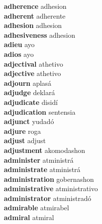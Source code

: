 \textbf{adherence } adhesion \\
\textbf{adherent } adherente \\
\textbf{adhesion } adhesion \\
\textbf{adhesiveness } adhesion \\
\textbf{adieu } ayo \\
\textbf{adios } ayo \\
\textbf{adjectival } athetivo \\
\textbf{adjective } athetivo \\
\textbf{adjourn } aplasá \\
\textbf{adjudge } deklará \\
\textbf{adjudicate } disidí \\
\textbf{adjudication } sentensia \\
\textbf{adjunct } yudadó \\
\textbf{adjure } roga \\
\textbf{adjust } adjust \\
\textbf{adjustment } akomodashon \\
\textbf{administer } atministrá \\
\textbf{administrate } atministrá \\
\textbf{administration } gobernashon \\
\textbf{administrative } atministrativo \\
\textbf{administrator } atministradó \\
\textbf{admirable } atmirabel \\
\textbf{admiral } atmiral \\
